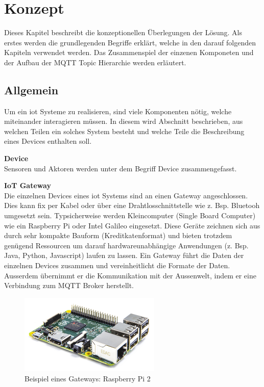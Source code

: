 \chapter{Konzept}
\label{chap:konzept}

Dieses Kapitel beschreibt die konzeptionellen Überlegungen der Lösung. Als erstes werden die grundlegenden Begriffe erklärt, welche in den darauf folgenden Kapiteln verwendet werden. Das Zusammenspiel der einzenen Komponeten und der Aufbau der MQTT Topic Hierarchie werden erläutert. 

\section{Allgemein}

Um ein \gls{iot} Systeme zu realisieren, sind viele Komponenten nötig, welche miteinander interagieren müssen. In diesem wird Abschnitt beschrieben, aus welchen Teilen ein solches System besteht und welche Teile die Beschreibung eines Devices enthalten soll.

\textbf{Device} \\
Sensoren und Aktoren werden unter dem Begriff Device zusammengefasst.


\textbf{IoT Gateway} \\
Die einzelnen Devices eines \gls{iot} Systems sind an einen Gateway angeschlossen. Dies kann fix per Kabel oder über eine Drahtlosschnittstelle wie z. Bsp. Bluetooh umgesetzt sein. Typsicherweise werden Kleincomputer (Single Board Computer) wie ein Raspberry Pi oder Intel Galileo eingesetzt. Diese Geräte zeichnen sich aus durch sehr kompakte Bauform (Kreditkatenformat) und bieten trotzdem genügend Ressourcen um darauf hardwareunabhängige Anwendungen (z. Bsp. Java, Python, Javascript) laufen zu lassen. 
Ein Gateway führt die Daten der einzelnen Devices zusammen und vereinheitlicht die Formate der Daten. Ausserdem übernimmt er die Kommunikation mit der Aussenwelt, indem er eine Verbindung zum MQTT Broker herstellt.

\begin{figure}[H]
	\centering
		\includegraphics[width=0.6\textwidth]{bilder/raspi_2.jpg}
	\caption{Beispiel eines Gateways: Raspberry Pi 2}
\end{figure}

